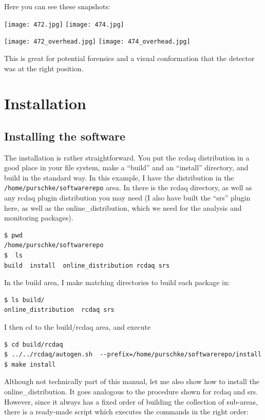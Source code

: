 \documentclass{article}[11pt]
\begin{document}
Here you can see these snapshots:

\texttt{[image: 472.jpg]}
\texttt{[image: 474.jpg]}

\texttt{[image: 472\_overhead.jpg]}
\texttt{[image: 474\_overhead.jpg]}

This is great for potential forensics and a visual conformation that the detector
was at the right position. 



\section{Installation}

\subsection{Installing the software}
\label{installation}

The installation is rather straightforward. You put the rcdaq
distribution in a good place in your file system, make a ``build'' and
an ``install'' directory, and build in the standard way. In this
example, I have the distribution in the
\verb|/home/purschke/softwarerepo| area. In there is the rcdaq
directory, as well as any rcdaq plugin distribution you may need (I
also have built the ``srs'' plugin here, as well as the
online\_distribution, which we need for the analysis and monitoring
packages).

\begin{verbatim} 
$ pwd
/home/purschke/softwarerepo
$  ls
build  install  online_distribution rcdaq srs
\end{verbatim}

In the build area, I make matching directories to build each package in:

\begin{verbatim} 
$ ls build/
online_distribution  rcdaq srs
\end{verbatim}

I then cd to the build/rcdaq area, and execute 

\begin{verbatim} 
$ cd build/rcdaq
$ ../../rcdaq/autogen.sh  --prefix=/home/purschke/softwarerepo/install
$ make install
\end{verbatim}

Although not technically part of this manual, let me also show how to install
the online\_distribution. It goes analogous to the procedure shown for rcdaq and srs. 
However, since it always has a fixed order of building the collection of sub-areas, there is a 
ready-made script which executes the commands in the right order:
\end{document}
